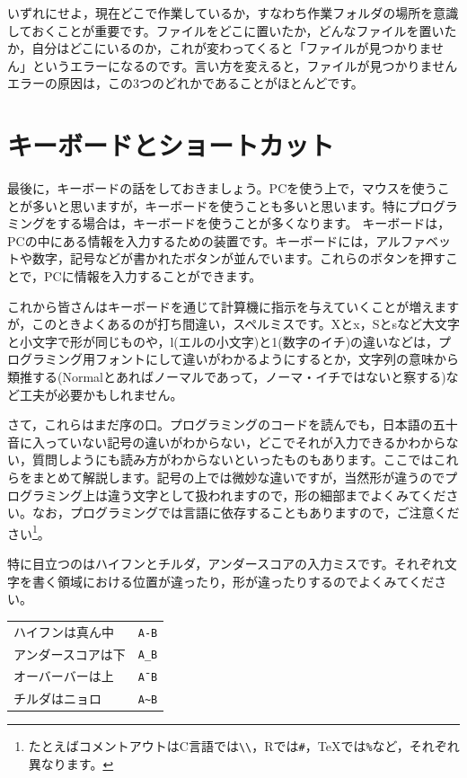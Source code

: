 \documentclass{ltjsbook}
\begin{document}
いずれにせよ，現在どこで作業しているか，すなわち作業フォルダの場所を意識しておくことが重要です。ファイルをどこに置いたか，どんなファイルを置いたか，自分はどこにいるのか，これが変わってくると「ファイルが見つかりません」というエラーになるのです。言い方を変えると，ファイルが見つかりませんエラーの原因は，この3つのどれかであることがほとんどです。

\section{キーボードとショートカット}
\label{signs}
最後に，キーボードの話をしておきましょう。PCを使う上で，マウスを使うことが多いと思いますが，キーボードを使うことも多いと思います。特にプログラミングをする場合は，キーボードを使うことが多くなります。
キーボードは，PCの中にある情報を入力するための装置です。キーボードには，アルファベットや数字，記号などが書かれたボタンが並んでいます。これらのボタンを押すことで，PCに情報を入力することができます。

これから皆さんはキーボードを通じて計算機に指示を与えていくことが増えますが，このときよくあるのが打ち間違い，スペルミスです。Xとx，Sとsなど大文字と小文字で形が同じものや，l(エルの小文字)と1(数字のイチ)の違いなどは，プログラミング用フォントにして違いがわかるようにするとか，文字列の意味から類推する(Normalとあればノーマルであって，ノーマ・イチではないと察する)など工夫が必要かもしれません。

さて，これらはまだ序の口。プログラミングのコードを読んでも，日本語の五十音に入っていない記号の違いがわからない，どこでそれが入力できるかわからない，質問しようにも読み方がわからないといったものもあります。ここではこれらをまとめて解説します。記号の上では微妙な違いですが，当然形が違うのでプログラミング上は違う文字として扱われますので，形の細部までよくみてください。なお，プログラミングでは言語に依存することもありますので，ご注意ください\footnote{たとえばコメントアウトはC言語では\verb|\\|，Rでは\verb|#|，TeXでは\verb|%|など，それぞれ異なります。}。

特に目立つのはハイフンとチルダ，アンダースコアの入力ミスです。それぞれ文字を書く領域における位置が違ったり，形が違ったりするのでよくみてください。
\begin{center}

	\Large{
		\begin{tabular}{ll}
			ハイフンは真ん中  & \verb|A-B| \\
			アンダースコアは下 & \verb|A_B| \\
			オーバーバーは上  & \verb|A¯B| \\
			チルダはニョロ   & \verb|A~B| \\
		\end{tabular}
	}

\end{center}
\end{document}
